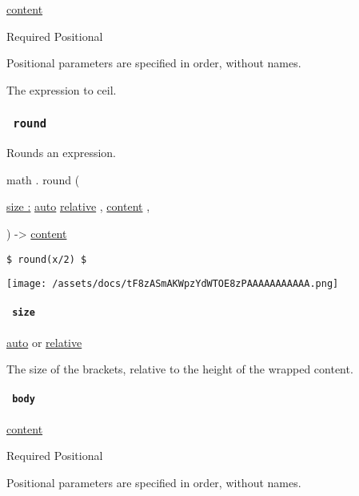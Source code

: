 \href{/docs/reference/foundations/content/}{content}

{Required} {{ Positional }}

\label{functions-ceil-body-positional-tooltip}
Positional parameters are specified in order, without names.

The expression to ceil.

\subsubsection{\texorpdfstring{\texttt{\ round\ }}{ round }}\label{functions-round}

Rounds an expression.

math { . } { round } (

{ \hyperref[functions-round-parameters-size]{size :}
\href{/docs/reference/foundations/auto/}{auto}
\href{/docs/reference/layout/relative/}{relative} , } {
\href{/docs/reference/foundations/content/}{content} , }

) -\textgreater{} \href{/docs/reference/foundations/content/}{content}

\begin{verbatim}
$ round(x/2) $
\end{verbatim}

\texttt{[image: /assets/docs/tF8zASmAKWpzYdWTOE8zPAAAAAAAAAAA.png]}

\paragraph{\texorpdfstring{\texttt{\ size\ }}{ size }}\label{functions-round-size}

\href{/docs/reference/foundations/auto/}{auto} {or}
\href{/docs/reference/layout/relative/}{relative}

The size of the brackets, relative to the height of the wrapped content.

\paragraph{\texorpdfstring{\texttt{\ body\ }}{ body }}\label{functions-round-body}

\href{/docs/reference/foundations/content/}{content}

{Required} {{ Positional }}

\label{functions-round-body-positional-tooltip}
Positional parameters are specified in order, without names.

